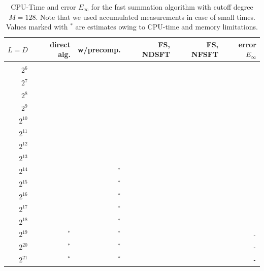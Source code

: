 \documentclass[11pt,a4paper,twoside,bibtotoc]{scrartcl}
\theoremstyle{plain}
\theoremstyle{definition}
\theoremstyle{remark}
\numberwithin{equation}{section}
\numberwithin{table}{section}
\numberwithin{figure}{section}
\begin{document}
\begin{table}[ht!]
  \begin{center}
    \begin{tabular}{r|r|r|r|r|r}
         $L = D$ &      direct alg.   &     w/precomp.     &      FS, NDSFT &      FS, NFSFT & error $E_{\infty}$\\\hline\\[-2.0ex]
           $2^6$ & \verb#1.0E-05#     & \verb#8.0E-05#     & \verb#1.1E-01# & \verb#6.2E-01# & \verb#7.7E-14# \\
           $2^7$ & \verb#6.0E-05#     & \verb#3.8E-04#     & \verb#2.2E-01# & \verb#6.2E-01# & \verb#6.5E-14# \\
           $2^8$ & \verb#2.5E-04#     & \verb#1.4E-03#     & \verb#4.5E-01# & \verb#6.2E-01# & \verb#4.1E-14# \\
           $2^9$ & \verb#1.0E-03#     & \verb#5.3E-03#     & \verb#8.9E-01# & \verb#6.3E-01# & \verb#2.8E-14# \\
        $2^{10}$ & \verb#4.0E-02#     & \verb#2.1E-02#     & \verb#1.8E+00# & \verb#6.5E-01# & \verb#3.6E-14# \\
        $2^{11}$ & \verb#1.6E+00#     & \verb#8.3E-02#     & \verb#3.6E+00# & \verb#6.6E-01# & \verb#1.8E-14# \\
        $2^{12}$ & \verb#6.4E+00#     & \verb#3.5E-01#     & \verb#7.1E+00# & \verb#7.2E-01# & \verb#1.3E-14# \\
        $2^{13}$ & \verb#2.6E+01#     & \verb#1.4E+00#     & \verb#1.4E+01# & \verb#8.2E-01# & \verb#6.7E-15# \\
        $2^{14}$ & \verb#1.0E+02#     & $^*$\verb#5.6E+00# & \verb#2.8E+01# & \verb#1.0E+00# & \verb#5.5E-15# \\
        $2^{15}$ & \verb#4.1E+02#     & $^*$\verb#2.2E+01# & \verb#5.7E+01# & \verb#1.5E+00# & \verb#4.0E-15# \\
        $2^{16}$ & \verb#1.6E+03#     & $^*$\verb#8.9E+01# & \verb#1.1E+02# & \verb#2.3E+00# & \verb#2.9E-15# \\
        $2^{17}$ & \verb#6.6E+03#     & $^*$\verb#3.6E+02# & \verb#2.3E+02# & \verb#4.0E+00# & \verb#2.4E-15# \\
        $2^{18}$ & \verb#2.6E+04#     & $^*$\verb#1.4E+03# & \verb#4.6E+02# & \verb#7.5E+00# & \verb#1.9E-15# \\
        $2^{19}$ & $^*$\verb#1.0E+05# & $^*$\verb#5.7E+03# & \verb#9.1E+02# & \verb#1.4E+01# & \verb#-# \\
        $2^{20}$ & $^*$\verb#4.2E+05# & $^*$\verb#2.3E+04# & \verb#1.8E+03# & \verb#2.8E+01# & \verb#-# \\
        $2^{21}$ & $^*$\verb#1.7E+06# & $^*$\verb#9.1E+04# & \verb#3.6E+03# & \verb#5.5E+01# & \verb#-# \\
    \end{tabular}

  \end{center}
  \caption{CPU-Time and error $E_{\infty}$ for the fast summation algorithm with cutoff degree $M = 128$.
    Note that we used accumulated measurements in case of small times. Values 
    marked with $^{*}$ are estimates owing to CPU-time and memory limitations.}
  \label{tab:TimeSpace}
\end{table}
\end{document}
